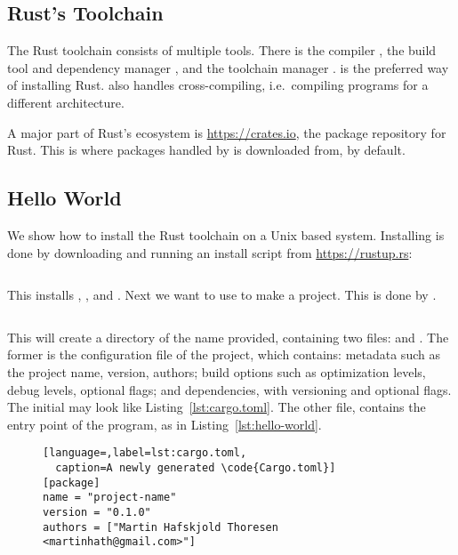 \documentclass[b5paper]{report}
\begin{document}
\begin{appendices}
  \chapter{Rust's Toolchain}
  The Rust toolchain consists of multiple tools. There is the compiler
  \rustc{}, the build tool and dependency manager \cargo{}, and the toolchain
  manager \rustup.  \rustup{} is the preferred way of installing
  Rust.  \rustup{} also handles cross-compiling, i.e.\
  compiling programs for a different architecture.

  A major part of Rust's ecosystem is \url{https://crates.io}, the package repository
  for Rust. This is where packages handled by \cargo{} is downloaded from, by default.

  \section{Hello World}
  We show how to install the Rust toolchain on a Unix based system.
  Installing \rustup{} is done by downloading and running an install script from
  \url{https://rustup.rs}:
  \begin{lstlisting}[language=Bash,numbers=none]
% curl https://sh.rustup.rs -sSf | sh
  \end{lstlisting}
  This installs \rustup{}, \cargo{}, and \rustc{}.
  Next we want to use \cargo{} to make a project. This is done by .
  \begin{lstlisting}[language=Bash,numbers=none]
% cargo init --bin <name-of-project>
  \end{lstlisting}
  This will create a directory of the name provided, containing two files:
  \code{Cargo.toml} and \code{src/main.rs}.
  The former is the configuration file of the project, which contains:
  metadata such as the project name, version, authors;
  build options such as optimization levels, debug levels, optional flags;
  and dependencies, with versioning and optional flags.
  The initial  may look like Listing~\ref{lst:cargo.toml}.
  The other file, \code{src/main.rs} contains the entry point of the program, as
  in Listing~\ref{lst:hello-world}.
  \clearpage{}

  \begin{figure}[ht]
  \begin{lstlisting}[language=,label=lst:cargo.toml,
  caption=A newly generated \code{Cargo.toml}]
[package]
name = "project-name"
version = "0.1.0"
authors = ["Martin Hafskjold Thoresen <martinhath@gmail.com>"]


\end{lstlisting}
\end{figure}
\end{appendices}
\end{document}
